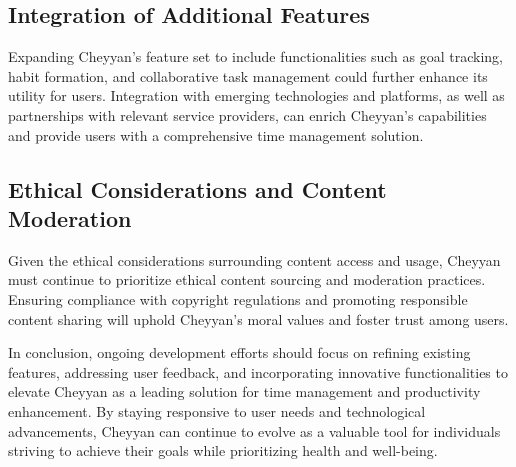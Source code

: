 \documentclass{l4proj}
\begin{document}
\subsection{Integration of Additional Features}
Expanding Cheyyan's feature set to include functionalities such as goal tracking, habit formation, and collaborative task management could further enhance its utility for users. Integration with emerging technologies and platforms, as well as partnerships with relevant service providers, can enrich Cheyyan's capabilities and provide users with a comprehensive time management solution.

\subsection{Ethical Considerations and Content Moderation}
Given the ethical considerations surrounding content access and usage, Cheyyan must continue to prioritize ethical content sourcing and moderation practices. Ensuring compliance with copyright regulations and promoting responsible content sharing will uphold Cheyyan's moral values and foster trust among users.

In conclusion, ongoing development efforts should focus on refining existing features, addressing user feedback, and incorporating innovative functionalities to elevate Cheyyan as a leading solution for time management and productivity enhancement. By staying responsive to user needs and technological advancements, Cheyyan can continue to evolve as a valuable tool for individuals striving to achieve their goals while prioritizing health and well-being.

\end{document}

